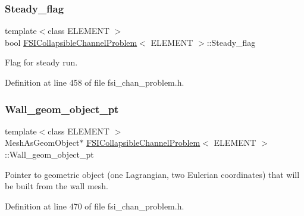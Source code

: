 \subsubsection{\texorpdfstring{Steady\+\_\+flag}{Steady\_flag}}
{\footnotesize\ttfamily template$<$class E\+L\+E\+M\+E\+NT $>$ \\
bool \hyperlink{classFSICollapsibleChannelProblem}{F\+S\+I\+Collapsible\+Channel\+Problem}$<$ E\+L\+E\+M\+E\+NT $>$\+::Steady\+\_\+flag\hspace{0.3cm}{\ttfamily [protected]}}



Flag for steady run. 



Definition at line 458 of file fsi\+\_\+chan\+\_\+problem.\+h.

\mbox{\label{classFSICollapsibleChannelProblem_a1fc8d15ea0d359e0df8a677415b77dc3}} 
\subsubsection{\texorpdfstring{Wall\+\_\+geom\+\_\+object\+\_\+pt}{Wall\_geom\_object\_pt}}
{\footnotesize\ttfamily template$<$class E\+L\+E\+M\+E\+NT $>$ \\
Mesh\+As\+Geom\+Object$\ast$ \hyperlink{classFSICollapsibleChannelProblem}{F\+S\+I\+Collapsible\+Channel\+Problem}$<$ E\+L\+E\+M\+E\+NT $>$\+::Wall\+\_\+geom\+\_\+object\+\_\+pt\hspace{0.3cm}{\ttfamily [protected]}}



Pointer to geometric object (one Lagrangian, two Eulerian coordinates) that will be built from the wall mesh. 



Definition at line 470 of file fsi\+\_\+chan\+\_\+problem.\+h.

\mbox{\label{classFSICollapsibleChannelProblem_a071b5cc9f660fdaccf1bf1e256320bfa}} 
